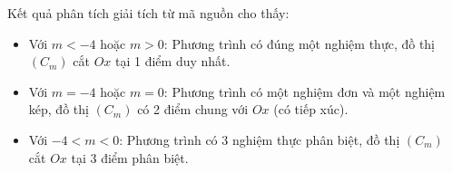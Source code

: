 Kết quả phân tích giải tích từ mã nguồn cho thấy:
\begin{itemize}
    \item Với $m < -4$ hoặc $m > 0$: Phương trình có đúng một nghiệm thực, đồ thị $(C_m)$ cắt $Ox$ tại 1 điểm duy nhất.
    \item Với $m = -4$ hoặc $m = 0$: Phương trình có một nghiệm đơn và một nghiệm kép, đồ thị $(C_m)$ có 2 điểm chung với $Ox$ (có tiếp xúc).
    \item Với $-4 < m < 0$: Phương trình có 3 nghiệm thực phân biệt, đồ thị $(C_m)$ cắt $Ox$ tại 3 điểm phân biệt.
\end{itemize}